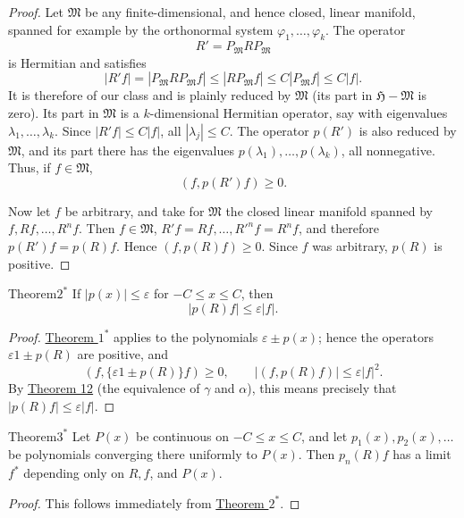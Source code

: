 ﻿\documentclass[paper=b5,fontsize=13pt,bookmarkpackage=false,twoside]{scrartcl}
\begin{document}
\begin{proof}
Let \(\mathfrak M\) be any finite-dimensional, and hence closed, linear
manifold, spanned for example by the orthonormal system
\(\varphi_1,\ldots,\varphi_k\).  The operator
\[
  R'=P_{\mathfrak M}RP_{\mathfrak M}
\]
is Hermitian and satisfies
\[
  |R'f|=|P_{\mathfrak M}RP_{\mathfrak M}f|
  \leq |RP_{\mathfrak M}f|
  \leq C|P_{\mathfrak M}f|
  \leq C|f|.
\]
It is therefore of our class and is plainly reduced by
\(\mathfrak M\) (its part in \(\mathfrak H-\mathfrak M\) is zero).
Its part in \(\mathfrak M\) is a \(k\)-dimensional Hermitian operator,
say with eigenvalues \(\lambda_1,\ldots,\lambda_k\).  Since
\(|R'f|\leq C|f|\), all \(|\lambda_j|\leq C\).  The operator \(p(R')\)
is also reduced by \(\mathfrak M\), and its part there has the
eigenvalues \(p(\lambda_1),\ldots,p(\lambda_k)\), all nonnegative.
Thus, if \(f\in\mathfrak M\),
\[
  (f,p(R')f)\geq0.
\]

Now let \(f\) be arbitrary, and take for \(\mathfrak M\) the closed
linear manifold spanned by \(f,Rf,\ldots,R^nf\).  Then \(f\in\mathfrak
M\), \(R'f=Rf,\ldots,R'^nf=R^nf\), and therefore
\(p(R')f=p(R)f\).  Hence \((f,p(R)f)\geq0\).  Since \(f\) was
arbitrary, \(p(R)\) is positive.
\end{proof}

\begin{namedstatement}{Theorem}{\(2^*\)}
\label{thm:appII-2}
If \(|p(x)|\leq\varepsilon\) for \(-C\leq x\leq C\), then
\[
  |p(R)f|\leq\varepsilon |f|.
\]
\end{namedstatement}

\begin{proof}
\hyperref[thm:appII-1]{Theorem \(1^*\)} applies to the polynomials
\(\varepsilon\pm p(x)\); hence the operators
\(\varepsilon 1\pm p(R)\) are positive, and
\[
  (f,\{\varepsilon1\pm p(R)\}f)\geq0,\qquad
  |(f,p(R)f)|\leq\varepsilon |f|^2.
\]
By \hyperref[thm:12]{Theorem 12} (the equivalence of \(\gamma\) and
\(\alpha\)), this means precisely that
\(|p(R)f|\leq\varepsilon|f|\).
\end{proof}

\begin{namedstatement}{Theorem}{\(3^*\)}
\label{thm:appII-3}
Let \(P(x)\) be continuous on \(-C\leq x\leq C\), and let
\(p_1(x),p_2(x),\ldots\) be polynomials converging there uniformly to
\(P(x)\).  Then \(p_n(R)f\) has a limit \(f^*\) depending only on
\(R,f\), and \(P(x)\).
\end{namedstatement}

\begin{proof}
This follows immediately from \hyperref[thm:appII-2]{Theorem \(2^*\)}.
\end{proof}
\end{document}
